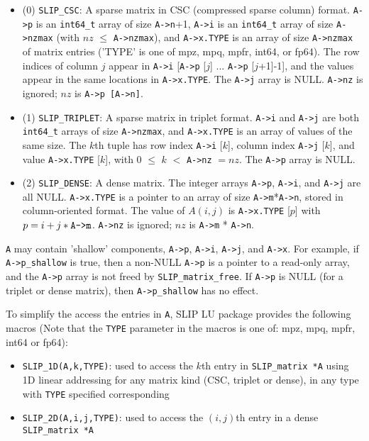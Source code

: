 \documentclass[12pt]{article}
\theoremstyle{definition}
\begin{document}
\begin{itemize}
\item
 (0) \verb|SLIP_CSC|:  A sparse matrix in CSC (compressed sparse column) format.
      \verb|A->p| is an \verb|int64_t| array of size \verb|A->n|+1, \verb|A->i|
      is an \verb|int64_t| array of size \verb|A->nzmax| (with $nz$ $\le$
      \verb|A->nzmax|), and \verb|A->x.TYPE| is an array of size
      \verb|A->nzmax| of matrix entries ('TYPE' is one of mpz, mpq, mpfr,
      int64, or fp64).  The row indices of column $j$ appear in \verb|A->i|
      [\verb|A->p| [$j$] ... \verb|A->p| [$j$+1]-1], and the values appear
      in the same locations in \verb|A->x.TYPE|.  The \verb|A->j| array is
      NULL.  \verb|A->nz| is ignored; $nz$ is \verb|A->p [A->n]|.

\item
 (1) \verb|SLIP_TRIPLET|:  A sparse matrix in triplet format.  \verb|A->i| and
     \verb|A->j| are both \verb|int64_t| arrays of size \verb|A->nzmax|, and
     \verb|A->x.TYPE| is an array of values of the same size.  The $k$th tuple
     has row index \verb|A->i| [$k$], column index \verb|A->j| [$k$], and value
     \verb|A->x.TYPE| [$k$], with 0 $\le$ $k$ $<$ \verb|A->nz| $=nz$. 
     The \verb|A->p| array is NULL.

\item
 (2) \verb|SLIP_DENSE|:  A dense matrix.  The integer arrays \verb|A->p|,
     \verb|A->i|, and \verb|A->j| are all NULL.  \verb|A->x.TYPE| is a pointer
     to an array of size \verb|A->m|*\verb|A->n|, stored in column-oriented
     format.  The value of $A(i,j)$ is \verb|A->x.TYPE| [$p$] with
     $p = i + j*\verb|A->m|$.  \verb|A->nz| is ignored; $nz$ is \verb|A->m| *
     \verb|A->n|.

\end{itemize}

 \verb|A| may contain 'shallow' components, \verb|A->p|,
 \verb|A->i|, \verb|A->j|, and \verb|A->x|.  For example, if
 \verb|A->p_shallow| is true, then a non-NULL \verb|A->p| is a pointer to a
 read-only array, and the \verb|A->p| array is not freed by
 \verb|SLIP_matrix_free|.  If \verb|A->p| is NULL (for a triplet or dense
 matrix), then \verb|A->p_shallow| has no effect.

To simplify the access the entries in \verb|A|, SLIP LU package provides the
following macros (Note that the \verb|TYPE| parameter in the macros is one of:
mpz, mpq, mpfr, int64 or fp64):

\begin{itemize}

\item
\verb|SLIP_1D(A,k,TYPE)|: used to access the $k$th entry in
                         \verb|SLIP_matrix *A| using 1D linear addressing for
                         any matrix kind (CSC, triplet or dense), in any type
                         with \verb|TYPE| specified corresponding

\item
\verb|SLIP_2D(A,i,j,TYPE)|: used to access the $(i,j)$th entry in a dense
                            \verb|SLIP_matrix *A|

\end{itemize}
\end{document}
